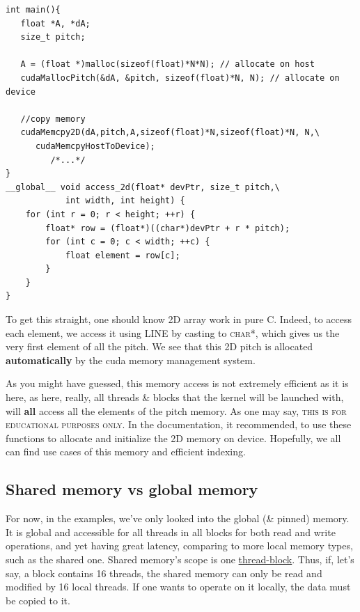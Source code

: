 \documentclass[12pt]{article}
\begin{document}
\begin{listing}[!ht]
\begin{verbatim}
int main(){
   float *A, *dA;
   size_t pitch;
     
   A = (float *)malloc(sizeof(float)*N*N); // allocate on host
   cudaMallocPitch(&dA, &pitch, sizeof(float)*N, N); // allocate on device

   //copy memory
   cudaMemcpy2D(dA,pitch,A,sizeof(float)*N,sizeof(float)*N, N,\
      cudaMemcpyHostToDevice);
         /*...*/
}
__global__ void access_2d(float* devPtr, size_t pitch,\
            int width, int height) {
    for (int r = 0; r < height; ++r) {
        float* row = (float*)((char*)devPtr + r * pitch);
        for (int c = 0; c < width; ++c) {
            float element = row[c];
        }
    }
}
\end{verbatim}
\caption*{To get this straight, one should know 2D array work in pure C. 
Indeed, to access each element, we access it using LINE by casting to \textsc{char*}, which 
gives us the very first element of all the pitch. We see that this 2D pitch is allocated 
\textbf{automatically} by the cuda memory management system.}
\label{allocation2d}
\end{listing}
As you might have guessed, this memory access is not extremely efficient as it is here, as here, really, 
all threads \& blocks that the kernel will be launched with, will \textbf{all} access all the elements of the 
pitch memory. As one may say, \textsc{this is for educational purposes only}. In the documentation, it recommended, 
to use these functions to allocate and initialize the 2D memory on device. Hopefully, we all can find 
use cases of this memory and efficient indexing.

\subsection{Shared memory vs global memory}

For now, in the examples, we've only looked into the global (\& pinned) memory. It is global and accessible 
for all threads in all blocks for both read and write operations, and yet having great latency, comparing to 
more local memory types, such as the shared one. Shared memory's scope is one \underline{thread-block}. Thus, if, let's say,
a block contains 16 threads, the shared memory can only be read and modified by 16 local threads. If one wants to operate on it 
locally, the data must be copied to it.
\end{document}
